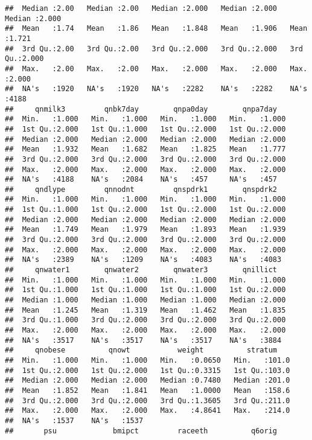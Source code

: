 \documentclass[
]{article}
\begin{document}
\begin{verbatim}
##  Median :2.00   Median :2.00   Median :2.000   Median :2.000   Median :2.000  
##  Mean   :1.74   Mean   :1.86   Mean   :1.848   Mean   :1.906   Mean   :1.721  
##  3rd Qu.:2.00   3rd Qu.:2.00   3rd Qu.:2.000   3rd Qu.:2.000   3rd Qu.:2.000  
##  Max.   :2.00   Max.   :2.00   Max.   :2.000   Max.   :2.000   Max.   :2.000  
##  NA's   :1920   NA's   :1920   NA's   :2282    NA's   :2282    NA's   :4188   
##     qnmilk3         qnbk7day        qnpa0day        qnpa7day    
##  Min.   :1.000   Min.   :1.000   Min.   :1.000   Min.   :1.000  
##  1st Qu.:2.000   1st Qu.:1.000   1st Qu.:2.000   1st Qu.:2.000  
##  Median :2.000   Median :2.000   Median :2.000   Median :2.000  
##  Mean   :1.932   Mean   :1.682   Mean   :1.825   Mean   :1.777  
##  3rd Qu.:2.000   3rd Qu.:2.000   3rd Qu.:2.000   3rd Qu.:2.000  
##  Max.   :2.000   Max.   :2.000   Max.   :2.000   Max.   :2.000  
##  NA's   :4188    NA's   :2084    NA's   :457     NA's   :457    
##     qndlype         qnnodnt         qnspdrk1        qnspdrk2    
##  Min.   :1.000   Min.   :1.000   Min.   :1.000   Min.   :1.000  
##  1st Qu.:1.000   1st Qu.:2.000   1st Qu.:2.000   1st Qu.:2.000  
##  Median :2.000   Median :2.000   Median :2.000   Median :2.000  
##  Mean   :1.749   Mean   :1.979   Mean   :1.893   Mean   :1.939  
##  3rd Qu.:2.000   3rd Qu.:2.000   3rd Qu.:2.000   3rd Qu.:2.000  
##  Max.   :2.000   Max.   :2.000   Max.   :2.000   Max.   :2.000  
##  NA's   :2389    NA's   :1209    NA's   :4083    NA's   :4083   
##     qnwater1        qnwater2        qnwater3        qnillict    
##  Min.   :1.000   Min.   :1.000   Min.   :1.000   Min.   :1.000  
##  1st Qu.:1.000   1st Qu.:1.000   1st Qu.:1.000   1st Qu.:2.000  
##  Median :1.000   Median :1.000   Median :1.000   Median :2.000  
##  Mean   :1.245   Mean   :1.319   Mean   :1.462   Mean   :1.835  
##  3rd Qu.:1.000   3rd Qu.:2.000   3rd Qu.:2.000   3rd Qu.:2.000  
##  Max.   :2.000   Max.   :2.000   Max.   :2.000   Max.   :2.000  
##  NA's   :3517    NA's   :3517    NA's   :3517    NA's   :3884   
##     qnobese          qnowt           weight          stratum     
##  Min.   :1.000   Min.   :1.000   Min.   :0.0650   Min.   :101.0  
##  1st Qu.:2.000   1st Qu.:2.000   1st Qu.:0.3315   1st Qu.:103.0  
##  Median :2.000   Median :2.000   Median :0.7480   Median :201.0  
##  Mean   :1.852   Mean   :1.841   Mean   :1.0000   Mean   :158.6  
##  3rd Qu.:2.000   3rd Qu.:2.000   3rd Qu.:1.3605   3rd Qu.:211.0  
##  Max.   :2.000   Max.   :2.000   Max.   :4.8641   Max.   :214.0  
##  NA's   :1537    NA's   :1537                                    
##       psu             bmipct         raceeth          q6orig     

\end{verbatim}
\end{document}

